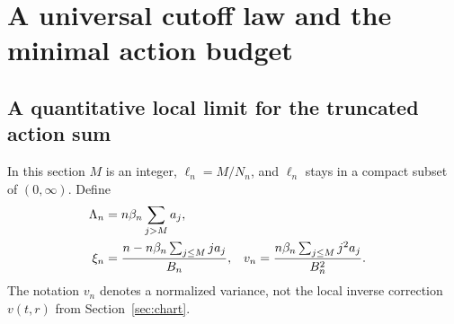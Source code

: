 \documentclass[11pt,a4paper]{article}
\numberwithin{equation}{section}
\theoremstyle{definition}
\theoremstyle{remark}
\begin{document}
\section{A universal cutoff law and the minimal action budget}
\label{sec:cutoff}

\subsection{A quantitative local limit for the truncated action sum}
In this section \(M\) is an integer, \(\ell_n=M/N_n\), and
\(\ell_n\) stays in a compact subset of \((0,\infty)\). Define
\begin{align}
 \Lambda_n&=n\beta_n\sum_{j>M}a_j,\notag\\
 \xi_n&=\frac{n-n\beta_n\sum_{j\le M}ja_j}{B_n},
 &v_n&=\frac{n\beta_n\sum_{j\le M}j^2a_j}{B_n^2}.
 \label{eq:truncated-parameters}
\end{align}
The notation \(v_n\) denotes a normalized variance, not the local inverse
correction \(v(t,r)\) from Section~\ref{sec:chart}.
\end{document}
